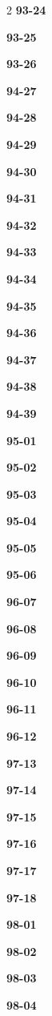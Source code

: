 \documentclass[10pt,a4paper]{article}
\begin{document}
\begin{multicols}{2}
\noindent\textbf{93-24}\ \par
\noindent\textbf{93-25}\ \par
\noindent\textbf{93-26}\ \par
\noindent\textbf{94-27}\ \par
\noindent\textbf{94-28}\ \par
\noindent\textbf{94-29}\ \par
\noindent\textbf{94-30}\ \par
\noindent\textbf{94-31}\ \par
\noindent\textbf{94-32}\ \par
\noindent\textbf{94-33}\ \par
\noindent\textbf{94-34}\ \par
\noindent\textbf{94-35}\ \par
\noindent\textbf{94-36}\ \par
\noindent\textbf{94-37}\ \par
\noindent\textbf{94-38}\ \par
\noindent\textbf{94-39}\ \par
\noindent\textbf{95-01}\ \par
\noindent\textbf{95-02}\ \par
\noindent\textbf{95-03}\ \par
\noindent\textbf{95-04}\ \par
\noindent\textbf{95-05}\ \par
\noindent\textbf{95-06}\ \par
\noindent\textbf{96-07}\ \par
\noindent\textbf{96-08}\ \par
\noindent\textbf{96-09}\ \par
\noindent\textbf{96-10}\ \par
\noindent\textbf{96-11}\ \par
\noindent\textbf{96-12}\ \par
\noindent\textbf{97-13}\ \par
\noindent\textbf{97-14}\ \par
\noindent\textbf{97-15}\ \par
\noindent\textbf{97-16}\ \par
\noindent\textbf{97-17}\ \par
\noindent\textbf{97-18}\ \par
\noindent\textbf{98-01}\ \par
\noindent\textbf{98-02}\ \par
\noindent\textbf{98-03}\ \par
\noindent\textbf{98-04}\ \par

\end{multicols}
\end{document}
